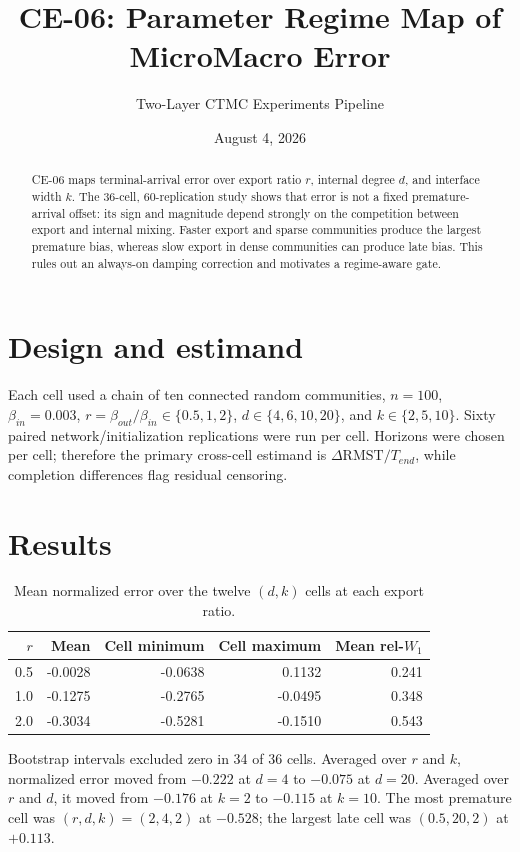 \documentclass[11pt,a4paper]{article}
\title{CE-06: Parameter Regime Map of MicroMacro Error}
\author{Two-Layer CTMC Experiments Pipeline}
\date{August 4, 2026}
\begin{document}
\maketitle
\begin{abstract}
CE-06 maps terminal-arrival error over export ratio $r$, internal degree $d$, and interface width $k$. The 36-cell, 60-replication study shows that error is not a fixed premature-arrival offset: its sign and magnitude depend strongly on the competition between export and internal mixing. Faster export and sparse communities produce the largest premature bias, whereas slow export in dense communities can produce late bias. This rules out an always-on damping correction and motivates a regime-aware gate.
\end{abstract}

\section{Design and estimand}
Each cell used a chain of ten connected random communities, $n=100$, $\beta_{in}=0.003$, $r=\beta_{out}/\beta_{in}\in\{0.5,1,2\}$, $d\in\{4,6,10,20\}$, and $k\in\{2,5,10\}$. Sixty paired network/initialization replications were run per cell. Horizons were chosen per cell; therefore the primary cross-cell estimand is $\Delta\mathrm{RMST}/T_{end}$, while completion differences flag residual censoring.

\section{Results}
\begin{table}[H]\centering
\caption{Mean normalized error over the twelve $(d,k)$ cells at each export ratio.}
\begin{tabular}{rrrrr}\toprule
$r$ & Mean & Cell minimum & Cell maximum & Mean rel-$W_1$\\\midrule
0.5 & -0.0028 & -0.0638 & 0.1132 & 0.241\\
1.0 & -0.1275 & -0.2765 & -0.0495 & 0.348\\
2.0 & -0.3034 & -0.5281 & -0.1510 & 0.543\\
\bottomrule\end{tabular}
\end{table}
Bootstrap intervals excluded zero in 34 of 36 cells. Averaged over $r$ and $k$, normalized error moved from $-0.222$ at $d=4$ to $-0.075$ at $d=20$. Averaged over $r$ and $d$, it moved from $-0.176$ at $k=2$ to $-0.115$ at $k=10$. The most premature cell was $(r,d,k)=(2,4,2)$ at $-0.528$; the largest late cell was $(0.5,20,2)$ at $+0.113$.
\end{document}

